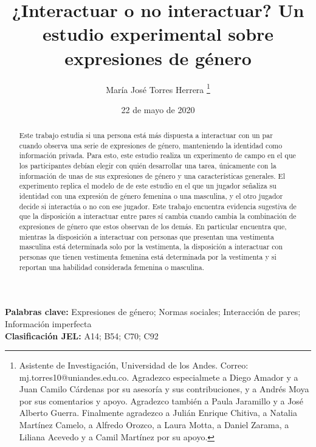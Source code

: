 \documentclass[12pt]{article}
\title{¿Interactuar o no interactuar? Un estudio experimental sobre expresiones de género}
\author{María José Torres Herrera \thanks{Asistente de Investigación, Universidad de los Andes. Correo: mj.torres10@uniandes.edu.co. Agradezco especialmete a Diego Amador y a Juan Camilo Cárdenas por su asesoría y sus contribuciones, y a Andrés Moya por sus comentarios y apoyo. Agradezco también a Paula Jaramillo y a José Alberto Guerra. Finalmente agradezco a Julián Enrique Chitiva, a Natalia Martínez Camelo, a Alfredo Orozco, a Laura Motta, a Daniel Zarama, a Liliana Acevedo y a Camil Martínez por su apoyo.}}
\date{22 de mayo de 2020}
\begin{document}
    \begin{singlespace}    
	\maketitle
	\end{singlespace} 
\begin{abstract}
Este trabajo estudia si una persona está más dispuesta a interactuar con un par cuando observa una serie de expresiones de género, manteniendo la identidad como información privada. Para esto, este estudio realiza un experimento de campo en el que  los participantes debían elegir con quién desarrollar una tarea, únicamente con la información de unas de sus expresiones de género y una características generales. El experimento replica el modelo de de este estudio en el que un jugador señaliza su identidad con una expresión de género femenina o una masculina, y el otro jugador decide si interactúa o no con ese jugador. Este trabajo encuentra evidencia sugestiva de que la disposición a interactuar entre pares sí cambia cuando cambia la combinación de expresiones de género que estos observan de los demás. En particular encuentra que, mientras la disposición a interactuar con personas que presentan una vestimenta masculina está determinada solo por la vestimenta, la disposición a interactuar con personas que tienen vestimenta femenina está determinada por la vestimenta y si reportan una habilidad considerada femenina o masculina. 
\end{abstract}
\vspace*{0.3cm}
\noindent \textbf{Palabras clave:} Expresiones de género; Normas sociales; Interacción de pares; Información imperfecta\\
\noindent \textbf{Clasificación JEL:} A14; B54; C70; C92
\vfill
\pagebreak








\vfill
\pagebreak
\begin{appendix}
    
    \vfill
    \pagebreak
    
    \vfill
    \pagebreak
    
    \vfill
    \pagebreak    
    
    \vfill
    \pagebreak    
    \vfill
    \pagebreak 
\end{appendix}

\vfill
\pagebreak


\end{document}
